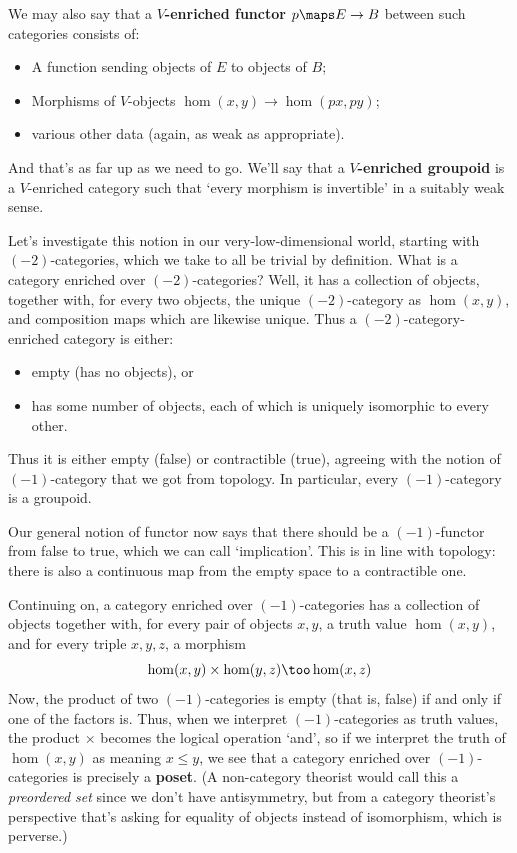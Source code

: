 \documentclass{amsart}
\begin{document}
We may also say that a \textbf{$V$-enriched functor} $p\maps E\to B$
between such categories consists of:
\begin{itemize}
\item A function sending objects of $E$ to objects of $B$;
\item Morphisms of $V$-objects $\hom(x,y)\to \hom(px,py)$;
\item various other data (again, as weak as appropriate).
\end{itemize}
And that's as far up as we need to go.  We'll say that a
\textbf{$V$-enriched groupoid} is a $V$-enriched category such that
`every morphism is invertible' in a suitably weak sense.

Let's investigate this notion in our very-low-dimensional world,
starting with $(-2)$-categories, which we take to all be trivial by
definition.  What is a category enriched over $(-2)$-categories?
Well, it has a collection of objects, together with, for every two
objects, the unique $(-2)$-category as $\hom(x,y)$, and composition
maps which are likewise unique.  Thus a $(-2)$-category-enriched
category is either:
\begin{itemize}
\item empty (has no objects), or
\item has some number of objects, each of which is uniquely isomorphic
  to every other.
\end{itemize}
Thus it is either empty (false) or contractible (true), agreeing with
the notion of $(-1)$-category that we got from topology.  In
particular, every $(-1)$-category is a groupoid.

Our general notion of functor now says that there should be a
$(-1)$-functor from false to true, which we can call `implication'.
This is in line with topology: there is also a continuous map from the
empty space to a contractible one.

Continuing on, a category enriched over $(-1)$-categories has a
collection of objects together with, for every pair of objects $x,y$,
a truth value $\hom(x,y)$, and for every triple $x,y,z$, a morphism
\[
\hom(x,y) \times \hom(y,z) \too \hom(x,z)
\]
Now, the product of two $(-1)$-categories is empty (that is,
false) if and only if one of the factors is.  Thus, when we interpret
$(-1)$-categories as truth values, the product $\times$ becomes the
logical operation `and', so if we interpret the truth of $\hom(x,y)$
as meaning $x\le y$, we see that a category enriched over
$(-1)$-categories is precisely a \textbf{poset}.  (A non-category
theorist would call this a \emph{preordered set} since we don't have
antisymmetry, but from a category theorist's perspective that's asking
for equality of objects instead of isomorphism, which is perverse.)
\end{document}
